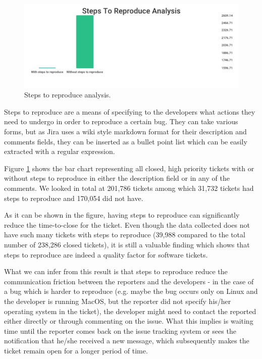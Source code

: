 \documentclass{mpaper}
\begin{document}
\begin{figure}[ht]
  \begin{center}
    \includegraphics[scale=0.25]{images/steps_to_reproduce.png}
  \end{center}
  \caption{\label{steps}Steps to reproduce analysis.}
\end{figure}

Steps to reproduce are a means of specifying to the developers what actions they need to undergo in order 
to reproduce a certain bug. They can take various forms, but as Jira uses a wiki style markdown format for 
their description and comments fields, they can be inserted as a bullet point list which can be easily 
extracted with a regular expression.

Figure \ref{steps} shows the bar chart representing all closed, high priority tickets with or without steps 
to reproduce in either the description field or in any of the comments. We looked in total at 201,786 tickets 
among which 31,732 tickets had steps to reproduce and 170,054 did not have.

As it can be shown in the figure, having steps to reproduce can significantly reduce the time-to-close 
for the ticket. Even though the data collected does not have such many tickets with steps to reproduce 
(39,988 compared to the total number of 238,286 closed tickets), it is still a valuable finding which shows 
that steps to reproduce are indeed a quality factor for software tickets. 

What we can infer from this result is that steps to reproduce reduce the communication friction between 
the reporters and the developers - in the case of a bug which is harder to reproduce (e.g. maybe the 
bug occurs only on Linux and the developer is running MacOS, but the reporter did not specify his/her 
operating system in the ticket), the developer might need to contact the reported either directly or 
through commenting on the issue. What this implies is waiting time until the reporter comes back on the 
issue tracking system or sees the notification that he/she received a new message, which subsequently makes 
the ticket remain open for a longer period of time. 
\end{document}
